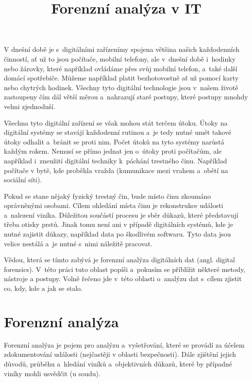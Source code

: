 \documentclass[thesis=B,czech]{FITthesis}[2012/06/26]
\title{Forenzní analýza v IT}
\begin{document}

\begin{introduction}
  \label{sec:uvod}

V dnešní době je s~digitálními zařízenímy spojena většina našich každodenních činností, ať už to jsou  počítače, mobilní telefony, ale v~dnešní době i~hodinky nebo žárovky, které například ovládáme přes svůj mobilní telefon, a~také další domácí spotřebiče. Můžeme například platit bezhotovostně ať už pomocí karty nebo chytrých hodinek. Všechny tyto digitální technologie jsou v~našem životě zastoupeny čím dál větší měrou a~nahrazují staré postupy, které postupy mnohdy velmi zjednoduší. 

Všechna tyto digitální zařízení se však mohou stát terčem útoku. Útoky na digitální systémy se stavájí každodenní rutinou a~je tedy nutné umět takové útoky odhalit a~bránit se proti nim. Počet útoků na tyto systémy narůstá každým rokem. Nemusí se přímo jednat jen o~útoky proti počítačům, ale například i~zneužití digitální techniky k~páchání trestného činu. Například počítače v bytě, kde proběhla vražda (kumunikace mezi vrahem a~obětí na sociální síti).

Pokud se stane nějaký fyzický trestný čin, bude místo činu zkoumáno oprávněnými osobami. Cílem ohledání místa činu je rekonstrukce události a~nalezení viníka. Důležitou součástí procesu je sběr důkazů, které představují třeba otisky prstů. Jinak tomu není ani v případě digitálních systémů, kde je nutné zajistit důkazy, například data po škodlivém softwaru. Tyto data jsou velice nestálá a~je nutné s~nimi náležitě pracovat.

Vědou, která se tímto zabývá je forenzní analýza digitálních dat (angl. digital forensics). V~této práci tuto oblast popíši a~pokusím se příblížit některé metody, nástroje a postupy. Volně řečeno jde v~této oblasti o~analýzu dat s~cílem zjistit co, kdy, kde a jak se stalo.
 

\end{introduction}

\chapter{Forenzní analýza}
Forenzní analýza je pojem pro analýzu a~vyšetřování, které se provádí za účelem zdokumentování události (nejčastěji v oblasti bezpečnosti). Dále zjištění jejich důvodů, průběhu a~hledání viníků a~objektivních důkazů, které by případné viníky mohli usvědčit (u soudu)\cite{for_uvod}.
\end{document}
